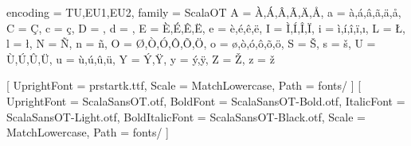 \usepackage[utf8]{luainputenc}



\usepackage[
    margin          = 0.75in, 
    paperwidth      = 6.25in, 
    paperheight     = 9.25in,
    bindingoffset   = 0.25in,
    layoutvoffset   = 0.125in,
    asymmetric
]{geometry}

\usepackage{amsmath,amsfonts,amssymb,amsthm,commath,amsgen,mathtools,scalerel,textcomp,siunitx}

\usepackage{microtype}
\usepackage{fontspec}

\usepackage{fontawesome}

\DeclareCharacterInheritance
   { encoding = {TU,EU1,EU2},
     family   = {ScalaOT} }
   { A = {\`A,\'A,\^A,\~A,\"A,\r A},
     a = {\`a,\'a,\^a,\~a,\"a,\r a},
     C = {\c C},
     c = {\c c},
     D = {\DH},
     d = {\dj},
     E = {\`E,\'E,\^E,\"E},
     e = {\`e,\'e,\^e,\"e},
     I = {\`I,\'I,\^I,\"I},
     i = {\`i,\'i,\^i,\"i,\i},
     L = {\L},
     l = {\l},
     N = {\~N},
     n = {\~n},
     O = {\O,\`O,\'O,\^O,\~O,\"O},
     o = {\o,\`o,\'o,\^o,\~o,\"o},
     S = {\v S},
     s = {\v s},
     U = {\`U,\'U,\^U,\"U},
     u = {\`u,\'u,\^u,\"u},
     Y = {\'Y,\"Y},
     y = {\'y,\"y},
     Z = {\v Z},
     z = {\v z}
   }

\usepackage[math-style=ISO]{unicode-math}
\usepackage{lualatex-math}

\setmonofont{PressStart}[
    UprightFont    =  prstartk.ttf,
    Scale          =  MatchLowercase,
    Path           =  fonts/
]
\setmainfont{ScalaSansOT}[
    UprightFont    =  ScalaSansOT.otf,
    BoldFont       =  ScalaSansOT-Bold.otf,
    ItalicFont     =  ScalaSansOT-Light.otf,
    BoldItalicFont =  ScalaSansOT-Black.otf,
    Scale          =  MatchLowercase,
    Path           =  fonts/
]

\usepackage{fancyhdr}


\usepackage{tikz}
\usetikzlibrary{shapes,arrows}
\usepackage{pgfplots}
\pgfplotsset{width=4.0cm}
\pgfplotsset{compat=newest}
\usetikzlibrary{patterns}
\usetikzlibrary{intersections}
\usetikzlibrary{calc,positioning}
\usetikzlibrary{shapes.misc,calc}
\usepackage{relsize}



